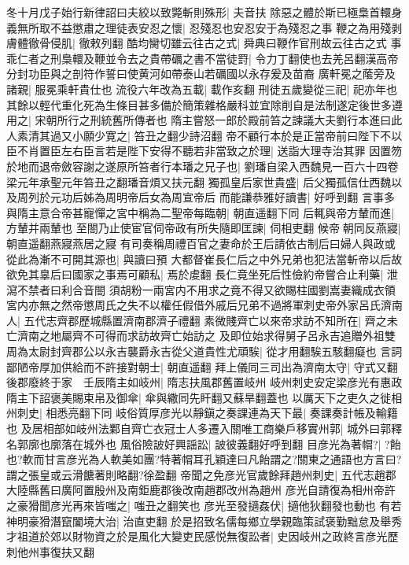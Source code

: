 冬十月戊子始行新律詔曰夫絞以致斃斬則殊形|{
	夫音扶}
除惡之體於斯已極梟首轘身義無所取不益懲肅之理徒表安忍之懷|{
	忍殘忍也安忍安于為殘忍之事}
鞭之為用殘剥膚體徹骨侵肌|{
	徹敕列翻}
酷均臠切雖云往古之式|{
	舜典曰鞭作官刑故云往古之式}
事乖仁者之刑梟轘及鞭並令去之貴帶礪之書不當徒罸|{
	令力丁翻使也去羌呂翻漢高帝分封功臣與之剖符作誓曰使黄河如帶泰山若礪國以永存爰及苗裔}
廣軒冕之䕃旁及諸親|{
	服冕乘軒貴仕也}
流役六年改為五載|{
	載作亥翻}
刑徒五歲變從三祀|{
	祀亦年也}
其餘以輕代重化死為生條目甚多備於簡策雜格嚴科並宜除削自是法制遂定後世多遵用之|{
	宋朝所行之刑統舊所傳者也}
隋主嘗怒一郎於殿前笞之諫議大夫劉行本進曰此人素清其過又小願少寛之|{
	笞丑之翻少詩沼翻}
帝不顧行本於是正當帝前曰陛下不以臣不肖置臣左右臣言若是陛下安得不聽若非當致之於理|{
	送詣大理寺治其罪}
因置笏於地而退帝斂容謝之遂原所笞者行本璠之兄子也|{
	劉璠自梁入西魏見一百六十四卷梁元年承聖元年笞丑之翻璠音煩又扶元翻}
獨孤皇后家世貴盛|{
	后父獨孤信仕西魏以及周列於元功后姊為周明帝后女為周宣帝后}
而能謙恭雅好讀書|{
	好呼到翻}
言事多與隋主意合帝甚寵憚之宮中稱為二聖帝每臨朝|{
	朝直遥翻下同}
后輒與帝方輦而進|{
	方輦并兩輦也}
至閤乃止使宦官伺帝政有所失隨即匡諫|{
	伺相吏翻}
候帝朝同反燕寢|{
	朝直遥翻燕寢燕居之寢}
有司奏稱周禮百官之妻命於王后請依古制后曰婦人與政或從此為漸不可開其源也|{
	與讀曰預}
大都督崔長仁后之中外兄弟也犯法當斬帝以后故欲免其辠后曰國家之事焉可顧私|{
	焉於䖍翻}
長仁竟坐死后性儉約帝嘗合止利藥|{
	泄瀉不禁者曰利合音閤}
須胡粉一兩宮内不用求之竟不得又欲賜柱國劉嵩妻織成衣領宮内亦無之然帝懲周氏之失不以權任假借外戚后兄弟不過將軍刺史帝外家呂氏濟南人|{
	五代志齊郡歷城縣置濟南郡濟子禮翻}
素微賤齊亡以來帝求訪不知所在|{
	齊之未亡濟南之地屬齊不可得而求訪故齊亡始訪之}
及即位始求得舅子呂永吉追贈外祖雙周為太尉封齊郡公以永吉襲爵永吉從父道貴性尤頑騃|{
	從才用翻騃五駭翻癡也}
言詞鄙陋帝厚加供給而不許接對朝士|{
	朝直遥翻}
拜上儀同三司出為濟南太守|{
	守式又翻}
後郡廢終于家　壬辰隋主如岐州|{
	隋志扶風郡舊置岐州}
岐州刺史安定梁彦光有惠政隋主下詔褒美賜束帛及御傘|{
	傘與繖同先盰翻又蘇旱翻蓋也}
以厲天下之吏久之徙相州刺史|{
	相悉亮翻下同}
岐俗質厚彦光以靜鎭之奏課連為天下最|{
	奏課奏計帳及輸籍也}
及居相部如岐州法鄴自齊亡衣冠士人多遷入關唯工商樂戶移實州郭|{
	城外曰郭釋名郭廓也廓落在城外也}
風俗險詖好興謡訟|{
	詖彼義翻好呼到翻}
目彦光為著㡌?|{
	?飴也?軟而甘言彦光為人軟美如團?特著㡌耳孔穎達曰凡飴謂之?關東之通語也方言曰?謂之張皇或云滑餹著則略翻?徐盈翻}
帝聞之免彦光官歲餘拜趙州刺史|{
	五代志趙郡大陸縣舊曰廣阿置殷州及南鉅鹿郡後改南趙郡改州為趙州}
彦光自請復為相州帝許之豪猾聞彦光再來皆嗤之|{
	嗤丑之翻笑也}
彦光至發擿姦伏|{
	擿他狄翻發也動也}
有若神明豪猾潛竄闔境大治|{
	治直吏翻}
於是招致名儒每鄉立學親臨策試褒勤黜怠及舉秀才祖道於郊以財物資之於是風化大變吏民感悦無復訟者|{
	史因岐州之政終言彦光歷刺他州事復扶又翻}
